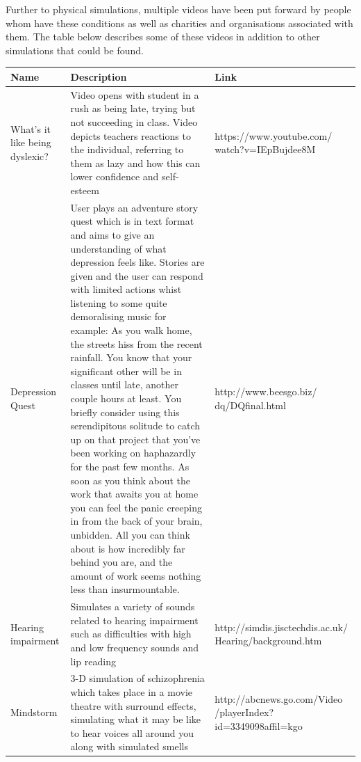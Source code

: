 \documentclass[11pt]{report}
\begin{document}
Further to physical simulations, multiple videos have been put forward by people whom have these conditions as well as charities and organisations associated with them. The table below describes some of these videos in addition to other simulations that could be found. 

\begin{table}
    \begin{tabular}{| p{2cm} | p{9cm} | p{5cm} |}
    \hline
    Name & Description & Link                                                                                                                                                                                   \\
    \hline
    \hline
  	What's it like being dyslexic? &  Video opens with student in a rush as being late, trying but not succeeding in class. Video depicts teachers reactions to the individual, referring to them as lazy and how this can lower confidence and self-esteem & https://www.youtube.com/ watch?v=IEpBujdee8M \\ \hline
  	Depression Quest  & User plays an adventure story quest which is in text format and aims to give an understanding of what depression feels like. Stories are given and the user can respond with limited actions whist listening to some quite demoralising music for example: As you walk home, the streets hiss from the recent rainfall. You know that your significant other will be in classes until late, another couple hours at least. You briefly consider using this serendipitous solitude to catch up on that project that you've been working on haphazardly for the past few months. As soon as you think about the work that awaits you at home you can feel the panic creeping in from the back of your brain, unbidden. All you can think about is how incredibly far behind you are, and the amount of work seems nothing less than insurmountable. & http://www.beesgo.biz/ dq/DQfinal.html \\ \hline
  	Hearing impairment & Simulates a variety of sounds related to hearing impairment such as difficulties with high and low frequency sounds and lip reading & http://simdis.jisctechdis.ac.uk/ Hearing/background.htm\\ \hline
Mindstorm & 3-D simulation of schizophrenia which takes place in a movie theatre with surround effects, simulating what it may be like to hear voices all around you along with simulated smells & http://abcnews.go.com/Video /playerIndex?id=3349098affil=kgo \\ \hline
    \end{tabular}
\end{table}
\end{document}

